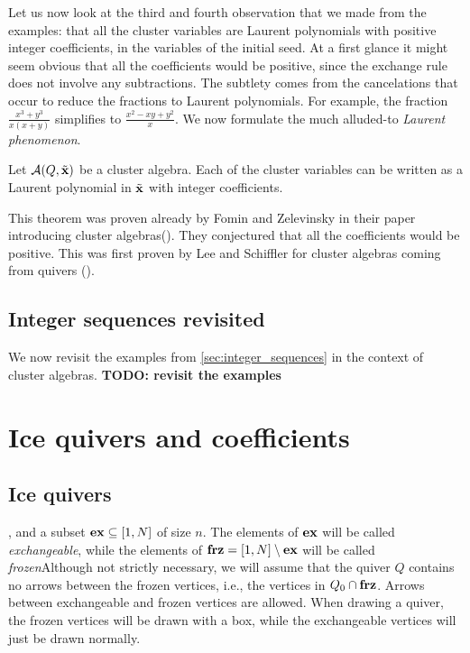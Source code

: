 \medskip

Let us now look at the third and fourth observation that we made from the examples:
that all the cluster variables are Laurent polynomials with positive integer
coefficients, in the variables of the initial seed. At a first glance it might seem
obvious that all the coefficients would be positive, since the exchange rule does not
involve any subtractions. The subtlety comes from the cancelations that occur to reduce
the fractions to Laurent polynomials. For example, the fraction $\frac{x^3 +
		y^3}{x(x+y)}$ simplifies to $\frac{x^2 - xy + y^2}{x}$. We now formulate the much
alluded-to \emph{Laurent phenomenon}.
\begin{theorem}\label{thm:laurent_phenomenon}
	Let $\mathcal{A} (Q, \tilde{\mathbf{x}})$ be a cluster algebra. Each of the cluster variables can be written as a Laurent polynomial in $\tilde{\mathbf{x}}$ with integer coefficients.
\end{theorem}
%
This theorem was proven already by Fomin and Zelevinsky in their paper introducing
cluster algebras(\cite[Theorem 3.1]{FominZelevinsky2002CAF}). They conjectured that all
the coefficients would be positive. This was first proven by Lee and Schiffler for
cluster algebras coming from quivers (\cite{LeeSchiffler2015PositivityCA}).

\subsection{Integer sequences revisited}\label{sec:sequences_revisited}

We now revisit the examples from \cref{sec:integer_sequences} in the context of cluster
algebras. \textbf{TODO: revisit the examples}

\section{Ice quivers and coefficients}\label{sec:ice_quivers_and_coefficients}
\subsection{Ice quivers}

, and a subset $\mathbf{ex} \subseteq [1, N]$ of size $n$. The elements of $\mathbf{ex}$ will be
called \emph{exchangeable}, while the elements of $\mathbf{frz} = [1, N]
	\setminus \mathbf{ex}$ will be called \emph{frozen}Although not strictly necessary, we will assume that the quiver $Q$ contains no arrows
between the frozen vertices, i.e., the vertices in $Q_0 \cap \mathbf{frz}$. Arrows between
exchangeable and frozen vertices are allowed. When drawing a quiver, the frozen
vertices will be drawn with a box, while the exchangeable vertices will just be drawn
normally.

